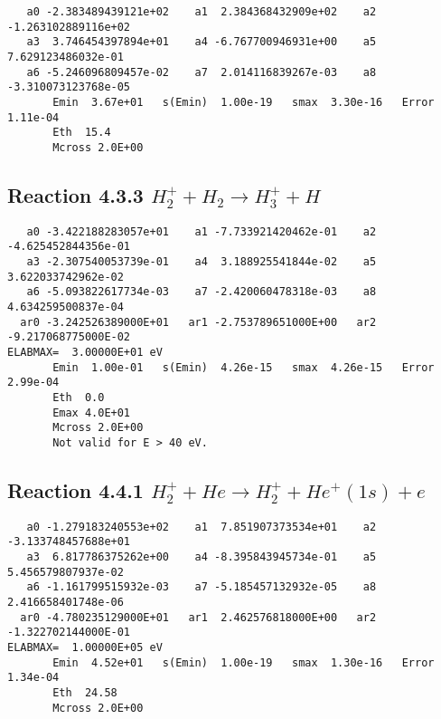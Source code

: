 \documentclass[12pt,dvipdfmx]{article}
\begin{document}
\begin{small}\begin{verbatim}
   a0 -2.383489439121e+02    a1  2.384368432909e+02    a2 -1.263102889116e+02
   a3  3.746454397894e+01    a4 -6.767700946931e+00    a5  7.629123486032e-01
   a6 -5.246096809457e-02    a7  2.014116839267e-03    a8 -3.310073123768e-05
       Emin  3.67e+01   s(Emin)  1.00e-19   smax  3.30e-16   Error 1.11e-04
       Eth  15.4
       Mcross 2.0E+00
\end{verbatim}\end{small}






\newpage
\subsection{
Reaction 4.3.3 $   H_2^+ + H_2 \rightarrow H_3^+ + H$}


\begin{small}\begin{verbatim}
   a0 -3.422188283057e+01    a1 -7.733921420462e-01    a2 -4.625452844356e-01
   a3 -2.307540053739e-01    a4  3.188925541844e-02    a5  3.622033742962e-02
   a6 -5.093822617734e-03    a7 -2.420060478318e-03    a8  4.634259500837e-04
  ar0 -3.242526389000E+01   ar1 -2.753789651000E+00   ar2 -9.217068775000E-02
ELABMAX=  3.00000E+01 eV
       Emin  1.00e-01   s(Emin)  4.26e-15   smax  4.26e-15   Error  2.99e-04
       Eth  0.0
       Emax 4.0E+01
       Mcross 2.0E+00
       Not valid for E > 40 eV.
\end{verbatim}\end{small}

\newpage
\subsection{
Reaction 4.4.1 $   H_2^+ + He \rightarrow H_2^+ + He^+(1s) + e$}


\begin{small}\begin{verbatim}
   a0 -1.279183240553e+02    a1  7.851907373534e+01    a2 -3.133748457688e+01
   a3  6.817786375262e+00    a4 -8.395843945734e-01    a5  5.456579807937e-02
   a6 -1.161799515932e-03    a7 -5.185457132932e-05    a8  2.416658401748e-06
  ar0 -4.780235129000E+01   ar1  2.462576818000E+00   ar2 -1.322702144000E-01
ELABMAX=  1.00000E+05 eV
       Emin  4.52e+01   s(Emin)  1.00e-19   smax  1.30e-16   Error  1.34e-04
       Eth  24.58
       Mcross 2.0E+00
\end{verbatim}\end{small}
\end{document}
